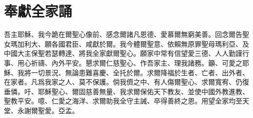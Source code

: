 \section*{奉獻全家誦}
吾主耶穌、我今跪在爾聖心像前、感念爾諸凡恩德、愛慕爾無窮美善。回念爾告聖女瑪加利大、願各國君臣、咸獻於爾。我今體爾聖意、依賴無原罪聖母瑪利亞、及中國大主保聖若瑟轉達、將我全家獻爾聖心。願家中常有信望愛三德、人人勤謹行事、用心祈禱、內外平安。懇求爾仁慈聖心、作吾家主、理我諸務。籲、可愛之耶穌、我將一切景況、無論患難喜慶、全托於爾。求爾降福於生者、亡者、出外者、在家者。凡爲我家之人、莫不保護。倘我儕之中、有人傷爾聖心、求爾寬宥、仍復垂憐。吁、耶穌聖心、爾固慈善無量、我求爾保佑天下教友、並使中國外教進教、聖教平安。噫、仁愛之海洋、求爾助我全守主誡、卒得善終之恩。用望全家均至天堂、永謝爾聖愛。{\cspace}亞孟。
